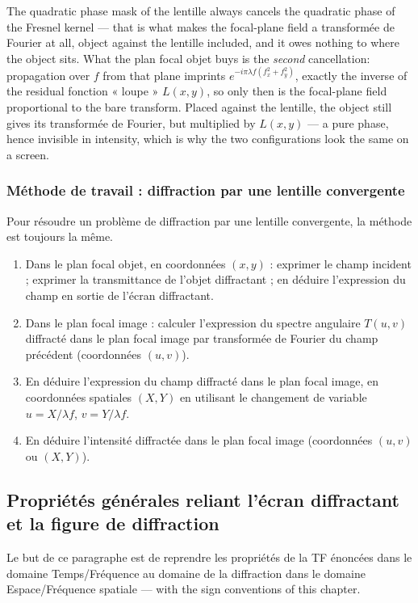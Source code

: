 \begin{conclusion}
  The quadratic phase mask of the lentille always cancels the quadratic phase of
  the Fresnel kernel --- that is what makes the focal-plane field a transformée
  de Fourier at all, object against the lentille included, and it owes nothing
  to where the object sits. What the plan focal objet buys is the
  \emph{second} cancellation: propagation over $f$ from that plane imprints
  $e^{-i\pi\lambda f(f_x^2+f_y^2)}$, exactly the inverse of the residual
  fonction « loupe » $L(x,y)$, so only then is the focal-plane field
  proportional to the bare transform. Placed against the lentille, the object
  still gives its transformée de Fourier, but multiplied by $L(x,y)$ --- a pure
  phase, hence invisible in intensity, which is why the two configurations look
  the same on a screen.
\end{conclusion}

\subsubsection{Méthode de travail : diffraction par une lentille convergente}
Pour résoudre un problème de diffraction par une lentille convergente, la
méthode est toujours la même.
\begin{enumerate}
  \item Dans le plan focal objet, en coordonnées $(x,y)$ : exprimer le champ
    incident ; exprimer la transmittance de l'objet diffractant ; en déduire
    l'expression du champ en sortie de l'écran diffractant.
  \item Dans le plan focal image : calculer l'expression du spectre angulaire
    $T(u,v)$ diffracté dans le plan focal image par transformée de Fourier du
    champ précédent (coordonnées $(u,v)$).
  \item En déduire l'expression du champ diffracté dans le plan focal image, en
    coordonnées spatiales $(X,Y)$ en utilisant le changement de variable
    $u = X/\lambda f$, $v = Y/\lambda f$.
  \item En déduire l'intensité diffractée dans le plan focal image (coordonnées
    $(u,v)$ ou $(X,Y)$).
\end{enumerate}

\subsection{Propriétés générales reliant l'écran diffractant et la figure de diffraction}
Le but de ce paragraphe est de reprendre les propriétés de la TF énoncées dans
le domaine Temps/Fréquence au domaine de la diffraction dans le domaine
Espace/Fréquence spatiale --- with the sign conventions of this chapter.

